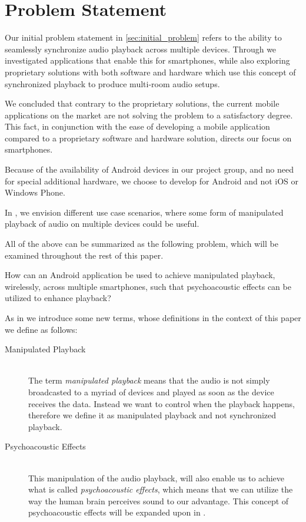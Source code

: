 \chapter{Problem Statement}\label{cha:problem_statement}
Our initial problem statement in \cref{sec:initial_problem} refers to the ability to seamlessly synchronize audio playback across multiple devices.
Through  we investigated applications that enable this for smartphones, while also exploring proprietary solutions with both software and hardware which use this concept of synchronized playback to produce multi-room audio setups.

We concluded that contrary to the proprietary solutions, the current mobile applications on the market are not solving the problem to a satisfactory degree.
This fact, in conjunction with the ease of developing a mobile application compared to a proprietary software and hardware solution, directs our focus on smartphones.

Because of the availability of Android devices in our project group, and no need for special additional hardware, we choose to develop for Android and not iOS or Windows Phone.

In , we envision different use case scenarios, where some form of manipulated playback of audio on multiple devices could be useful.

\bigskip
All of the above can be summarized as the following problem, which will be examined throughout the rest of this paper.

\begin{problemstatement}
    How can an Android application be used to achieve manipulated playback, wirelessly, across multiple smartphones, such that psychoacoustic effects can be utilized to enhance playback?
\end{problemstatement}

\bigskip\noindent
As in  we introduce some new terms, whose definitions in the context of this paper we define as follows:

\begin{description}
    \item[Manipulated Playback] \hfill \\
        The term \textit{manipulated playback} means that the audio is not simply broadcasted to a myriad of devices and played as soon as the device receives the data.
        Instead we want to control when the playback happens, therefore we define it as manipulated playback and not synchronized playback.
    \item[Psychoacoustic Effects] \hfill \\
        This manipulation of the audio playback, will also enable us to achieve what is called \textit{psychoacoustic effects}, which means that we can utilize the way the human brain perceives sound to our advantage.
        This concept of psychoacoustic effects will be expanded upon in .
\end{description}
